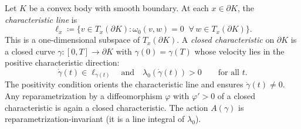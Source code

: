 \begin{definition}\label{def:closed-characteristic}
Let $K$ be a convex body with smooth boundary.
At each $x \in \partial K$, the \emph{characteristic line} is
\[
  \ell_x \coloneqq \{ v \in T_x(\partial K) : \omega_0(v, w) = 0
  \;\;\forall\, w \in T_x(\partial K) \}.
\]
This is a one-dimensional subspace of $T_x(\partial K)$.
A \emph{closed characteristic} on $\partial K$ is a closed curve
$\gamma \colon [0, T] \to \partial K$ with $\gamma(0) = \gamma(T)$
whose velocity lies in the positive characteristic direction:
\[
  \dot{\gamma}(t) \in \ell_{\gamma(t)}
  \quad\text{and}\quad
  \lambda_0(\dot{\gamma}(t)) > 0
  \qquad \text{for all } t.
\]
The positivity condition orients the characteristic line and
ensures $\dot{\gamma}(t) \neq 0$.
Any reparametrization by a diffeomorphism $\varphi$ with $\varphi' > 0$
of a closed characteristic is again a closed characteristic.
The action $A(\gamma)$ is reparametrization-invariant
(it is a line integral of $\lambda_0$).
\end{definition}

